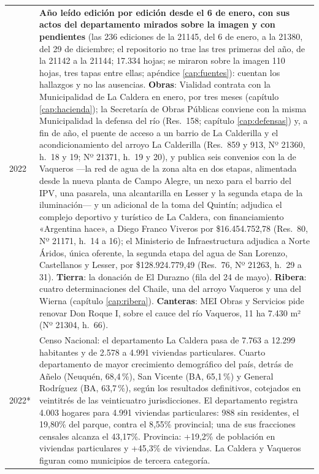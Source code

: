 \begin{longtable}{@{}p{2.7cm}p{10.3cm}@{}}
2022 & \textbf{Año leído edición por edición desde el 6 de enero, con sus actos del departamento mirados sobre la imagen y con pendientes} (las 236 ediciones de la 21145, del 6 de enero, a la 21380, del 29 de diciembre; el repositorio no trae las tres primeras del año, de la 21142 a la 21144; 17.334 hojas; se miraron sobre la imagen 110 hojas, tres tapas entre ellas; apéndice \ref{cap:fuentes}): cuentan los hallazgos y no las ausencias. \textbf{Obras}: Vialidad contrata con la Municipalidad de La Caldera en enero, por tres meses (capítulo \ref{cap:hacienda}); la Secretaría de Obras Públicas conviene con la misma Municipalidad la defensa del río (Res.\ 158; capítulo \ref{cap:defensas}) y, a fin de año, el puente de acceso a un barrio de La Calderilla y el acondicionamiento del arroyo La Calderilla (Res.\ 859 y 913, Nº 21360, h.\ 18 y 19; Nº 21371, h.\ 19 y 20), y publica seis convenios con la de Vaqueros ---la red de agua de la zona alta en dos etapas, alimentada desde la nueva planta de Campo Alegre, un nexo para el barrio del IPV, una pasarela, una alcantarilla en Lesser y la segunda etapa de la iluminación--- y un adicional de la toma del Quintín; adjudica el complejo deportivo y turístico de La Caldera, con financiamiento «Argentina hace», a Diego Franco Viveros por \$16.454.752,78 (Res.\ 80, Nº 21171, h.\ 14 a 16); el Ministerio de Infraestructura adjudica a Norte Áridos, única oferente, la segunda etapa del agua de San Lorenzo, Castellanos y Lesser, por \$128.924.779,49 (Res.\ 76, Nº 21263, h.\ 29 a 31). \textbf{Tierra}: la donación de El Durazno (fila del 24 de mayo). \textbf{Ribera}: cuatro determinaciones del Chaile, una del arroyo Vaqueros y una del Wierna (capítulo \ref{cap:ribera}). \textbf{Canteras}: MEI Obras y Servicios pide renovar Don Roque I, sobre el cauce del río Vaqueros, 11 ha 7.430 m² (Nº 21304, h.\ 66). \\
2022* & Censo Nacional: el departamento La Caldera pasa de 7.763 a 12.299 habitantes y de 2.578 a 4.991 viviendas particulares. Cuarto departamento de mayor crecimiento demográfico del país, detrás de Añelo (Neuquén, 68,4\,\%), San Vicente (BA, 65,1\,\%) y General Rodríguez (BA, 63,7\,\%), según los resultados definitivos, cotejados en veintitrés de las veinticuatro jurisdicciones. El departamento registra 4.003 hogares para 4.991 viviendas particulares: 988 sin residentes, el 19,80\% del parque, contra el 8,55\% provincial; una de sus fracciones censales alcanza el 43,17\%. Provincia: +19,2\% de población en viviendas particulares y +45,3\% de viviendas. La Caldera y Vaqueros figuran como municipios de tercera categoría. \\

\end{longtable}
